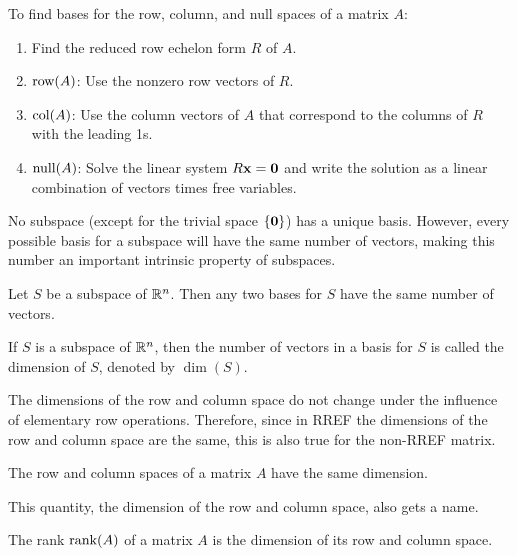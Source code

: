 \documentclass[../m73main.tex]{subfiles}
\begin{document}
\begin{definition}
	To find bases for the row, column, and null spaces of a matrix $A$:
	\begin{enumerate}
		\item Find the reduced row echelon form $R$ of $A$.
		\item $\textrm{row}(A)$: Use the nonzero row vectors of $R$.
		\item $\textrm{col}(A)$: Use the column vectors of $A$ that correspond to the columns of $R$ with the leading 1s.
		\item $\textrm{null}(A)$: Solve the linear system $R\mathbf{x} = \mathbf{0}$ and write the solution as a linear combination of vectors times free variables.
	\end{enumerate}
\end{definition}

No subspace (except for the trivial space $\{ \mathbf{0} \}$) has a unique basis.
However, every possible basis for a subspace will have the same number of vectors, making this number an important intrinsic property of subspaces.

\begin{theorem}
	Let $S$ be a subspace of $\mathbb{R}^n$.
	Then any two bases for $S$ have the same number of vectors.
\end{theorem}

\begin{definition}[Dimension]
	If $S$ is a subspace of $\mathbb{R}^n$, then the number of vectors in a basis for $S$ is called the dimension of $S$, denoted by $\dim(S)$.
\end{definition}

The dimensions of the row and column space do not change under the influence of elementary row operations.
Therefore, since in RREF the dimensions of the row and column space are the same, this is also true for the non-RREF matrix.

\begin{theorem}
	The row and column spaces of a matrix $A$ have the same dimension.
\end{theorem}

This quantity, the dimension of the row and column space, also gets a name.

\begin{definition}[Rank]
	The rank $\textrm{rank}(A)$ of a matrix $A$ is the dimension of its row and column space.
\end{definition}
\end{document}
